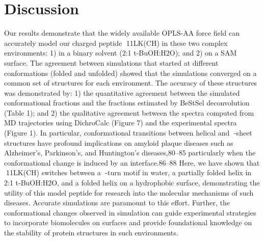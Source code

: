 \section{Discussion}
%

Our results demonstrate that the widely available OPLS-AA force field can accurately model our charged peptide 11LK(CH) in these two complex environments: 1) in a binary solvent (2:1 t-BuOH:H2O); and 2) on a SAM surface. The agreement between simulations that started at different conformations (folded and unfolded) showed that the simulations converged on a common set of structures for each environment. The accuracy of these structures was demonstrated by: 1) the quantitative agreement between the simulated conformational fractions and the fractions estimated by BeStSel deconvolution (Table 1); and 2) the qualitative agreement between the spectra computed from MD trajectories using DichroCalc (Figure 7) and the experimental spectra (Figure 1). In particular, conformational transitions between helical and -sheet structures have profound implications on amyloid plaque diseases such as Alzheimer’s, Parkinson’s, and Huntington’s diseases,80–85 particularly when the conformational change is induced by an interface.86–88 Here, we have shown that 11LK(CH) switches between a -turn motif in water, a partially folded helix in 2:1 t-BuOH:H2O, and a folded helix on a hydrophobic surface, demonstrating the utility of this model peptide for research into the molecular mechanisms of such diseases. Accurate simulations are paramount to this effort. Further, the conformational changes observed in simulation can guide experimental strategies to incorporate biomolecules on surfaces and provide foundational knowledge on the stability of protein structures in such environments.
